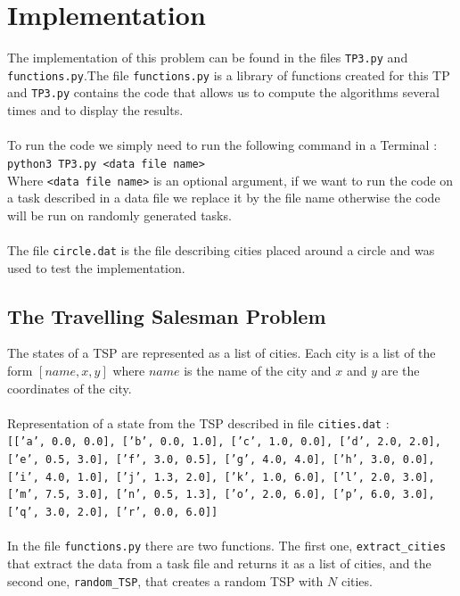\documentclass[14pt]
{article}
\begin{document}
\section{Implementation}
The implementation of this problem can be found in the files \texttt{TP3.py} and \texttt{functions.py}.The file \texttt{functions.py} is a library of functions created for this TP and \texttt{TP3.py} contains the code that allows us to compute the algorithms several times and to display the results.\\
\\
To run the code we simply need to run the following command in a Terminal :\\
\texttt{python3 TP3.py <data file name>}\\
Where \texttt{<data file name>} is an optional argument, if we want to run the code on a task described in a data file we replace it by the file name otherwise the code will be run on randomly generated tasks.\\
\\
The file \texttt{circle.dat} is the file describing cities placed around a circle and was used to test the implementation.

\subsection{The Travelling Salesman Problem}
The states of a TSP are represented as a list of cities. Each city is a list of the form $[name, x ,y]$ where $name$ is the name of the city and $x$ and $y$ are the coordinates of the city.\\
\\
Representation of a state from the TSP described in file \texttt{cities.dat} :\\
\texttt{[['a', 0.0, 0.0], ['b', 0.0, 1.0], ['c', 1.0, 0.0], ['d', 2.0, 2.0], ['e', 0.5, 3.0], ['f', 3.0, 0.5], ['g', 4.0, 4.0], ['h', 3.0, 0.0], ['i', 4.0, 1.0], ['j', 1.3, 2.0], ['k', 1.0, 6.0], ['l', 2.0, 3.0], ['m', 7.5, 3.0], ['n', 0.5, 1.3], ['o', 2.0, 6.0], ['p', 6.0, 3.0], ['q', 3.0, 2.0], ['r', 0.0, 6.0]]}\\
\\
In the file \texttt{functions.py} there are two functions. The first one, \texttt{extract\_cities} that extract the data from a task file and returns it as a list of cities, and the second one, \texttt{random\_TSP}, that creates a random TSP with $N$ cities.
\end{document}

